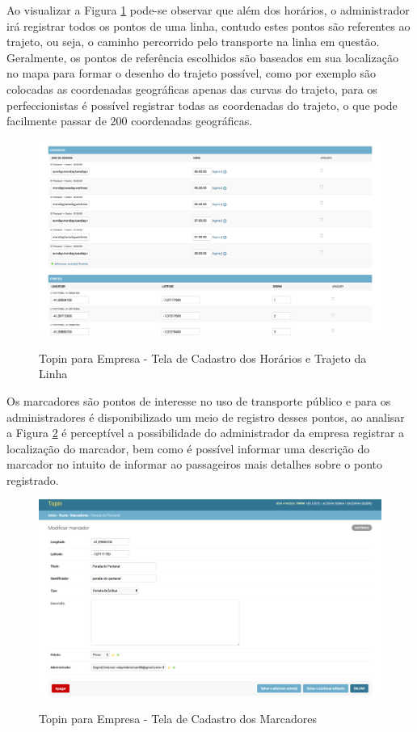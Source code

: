{{{{{{{Ao visualizar a Figura \ref{fig:empresa-cadastro-horarios-trajeto} pode-se observar que além dos horários, o administrador irá registrar todos os pontos de uma linha, contudo estes pontos são referentes ao trajeto, ou seja, o caminho percorrido pelo transporte na linha em questão. Geralmente, os pontos de referência escolhidos são baseados em sua localização no mapa para formar o desenho do trajeto possível, como por exemplo são colocadas as coordenadas geográficas apenas das curvas do trajeto, para os perfeccionistas é possível registrar todas as coordenadas do trajeto, o que pode facilmente passar de 200 coordenadas geográficas.

\begin{figure}[H]
\caption{Topin para Empresa - Tela de Cadastro dos Horários e Trajeto da Linha}
\centering
\includegraphics[width=1.0\textwidth]{imagens/cadastro-horarios-pontos.png}
\label{fig:empresa-cadastro-horarios-trajeto}
\end{figure}

Os marcadores são pontos de interesse no uso de transporte público e para os administradores é disponibilizado um meio de registro desses pontos, ao analisar a Figura \ref{fig:empresa-cadastro-ponto} é perceptível a possibilidade do administrador da empresa registrar a localização do marcador, bem como é possível informar uma descrição do marcador no intuito de informar ao passageiros mais detalhes sobre o ponto registrado.

\begin{figure}[H]
\caption{Topin para Empresa - Tela de Cadastro dos Marcadores}
\centering
\includegraphics[width=1.0\textwidth]{imagens/cadastro-ponto.png}
\label{fig:empresa-cadastro-ponto}
\end{figure}

}}}}}}}
